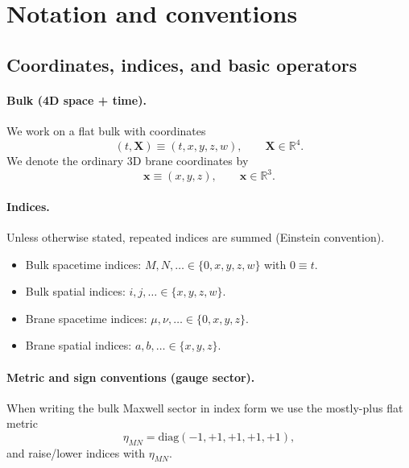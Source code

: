 \documentclass[11pt]{article}
\begin{document}
\appendix

\section{Notation and conventions}
\label{app:notation}

\subsection{Coordinates, indices, and basic operators}

\paragraph{Bulk (4D space + time).}
We work on a flat bulk with coordinates
\begin{equation}
  (t,\mathbf X) \equiv (t,x,y,z,w),\qquad \mathbf X\in\mathbb R^4.
\end{equation}
We denote the ordinary 3D brane coordinates by
\begin{equation}
  \mathbf x \equiv (x,y,z),\qquad \mathbf x\in\mathbb R^3.
\end{equation}

\paragraph{Indices.}
Unless otherwise stated, repeated indices are summed (Einstein convention).
\begin{itemize}
  \item Bulk spacetime indices: $M,N,\ldots \in \{0,x,y,z,w\}$ with $0\equiv t$.
  \item Bulk spatial indices: $i,j,\ldots \in \{x,y,z,w\}$.
  \item Brane spacetime indices: $\mu,\nu,\ldots \in \{0,x,y,z\}$.
  \item Brane spatial indices: $a,b,\ldots \in \{x,y,z\}$.
\end{itemize}

\paragraph{Metric and sign conventions (gauge sector).}
When writing the bulk Maxwell sector in index form we use the mostly-plus flat metric
\begin{equation}
  \eta_{MN} = \mathrm{diag}(-1,+1,+1,+1,+1),
\end{equation}
and raise/lower indices with $\eta_{MN}$.
\end{document}
